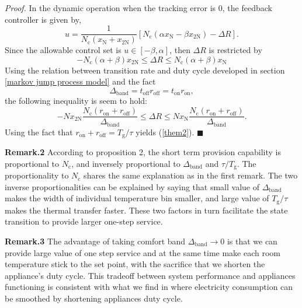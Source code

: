 \documentclass[journal]{IEEEtran}
\begin{document}
\textit{Proof.} In the dynamic operation when the tracking error is 0, the feedback controller is given by,
\begin{equation}
\label{uDeltaR}
u=\frac{1}{N_{\textrm{c}}(x_{\textrm{N}}+x_{\textrm{2N}})}[N_{\textrm{c}}(\alpha x_{\textrm{N}}-\beta x_{\textrm{2N}})-\Delta R].
\end{equation}
Since the allowable control set is $u\in [-\beta,\alpha]$, then $\Delta R$ is restricted by
\begin{equation}
\label{restriction2}
-N_{\textrm{c}}(\alpha+\beta)x_{\textrm{2N}}\leq \Delta R \leq N_{\textrm{c}}(\alpha+\beta)x_{\textrm{N}}
\end{equation}
Using the relation between transition rate and duty cycle developed in section \ref{markov jump process model} and the fact
\begin{displaymath}
\Delta_{\textrm{band}}=t_{\textrm{off}}r_{\textrm{off}}=t_{\textrm{on}}r_{\textrm{on}},
\end{displaymath}
the following inequality is seem to hold:
\begin{equation}
-N x_{\textrm{2N}}\frac{N_{\textrm{c}}(r_{\textrm{on}}+r_{\textrm{off}})}{\Delta_{\textrm{band}}} \leq \Delta R \leq N x_{\textrm{N}}\frac{N_{\textrm{c}}(r_{\textrm{on}}+r_{\textrm{off}})}{\Delta_{\textrm{band}}}.
\end{equation}
Using the fact that $r_{\textrm{on}}+r_{\textrm{off}}=T_{\textrm{g}}/\tau$ yields (\ref{them2}). $\blacksquare$

\textbf{Remark.2} According to proposition 2, the short term provision capability is proportional to $N_{\textrm{c}}$, and inversely proportional to $\Delta_{\textrm{band}}$ and  $\tau/T_{\textrm{g}}$. The proportionality to $N_{\textrm{c}}$ shares the same explanation as in the first remark. The two inverse proportionalities can be explained by saying that small value of $\Delta_{\textrm{band}}$ makes the width of individual temperature bin smaller, and large value of $T_{\textrm{g}}/\tau$ makes the thermal transfer faster. These two factors in turn facilitate the state transition to provide larger one-step service. 

\textbf{Remark.3} The advantage of taking comfort band $\Delta_{\textrm{band}}\rightarrow 0$ is that we can provide large value of one step service and at the same time make each room temperature stick to the set point, with the sacrifice that we shorten the appliance's duty cycle. This tradeoff between system performance and appliances functioning is consistent with what we find in \cite{bowen} where electricity consumption can be smoothed by shortening appliances duty cycle.
\end{document}
